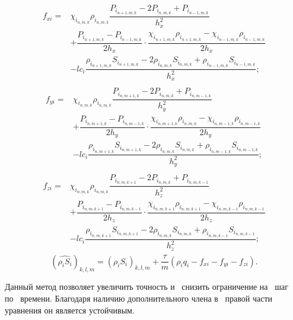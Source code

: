 \begin{eqnarray*}
  \begin{aligned}
    f_{xi} =& \chi_{i_{n,m,k}} \rho_{i_{n,m,k}} \dfrac{P_{i_{n+1,m,k}} - 2P_{i_{n,m,k}} + P_{i_{n-1,m,k}}}{h_x^2} \\
    &+ \dfrac{P_{i_{n+1,m,k}}-P_{i_{n-1,m,k}}}{2h_x} \cdot \dfrac{\chi_{i_{n+1,m,k}} \rho_{i_{n+1,m,k}}-\chi_{i_{n-1,m,k}} \rho_{i_{n-1,m,k}}}{2h_x} \\
    &- lc_i\dfrac{\rho_{i_{n+1,m,k}}S_{i_{n+1,m,k}} - 2\rho_{i_{n,m,k}}S_{i_{n,m,k}} + \rho_{i_{n-1,m,k}}S_{i_{n-1,m,k}}}{h_x^2};
  \end{aligned}
\end{eqnarray*}
\begin{eqnarray*}
  \begin{aligned}
    f_{yi} =& \chi_{i_{n,m,k}} \rho_{i_{n,m,k}} \dfrac{P_{i_{n,m+1,k}} - 2P_{i_{n,m,k}} + P_{i_{n,m-1,k}}}{h_y^2} \\
    &+ \dfrac{P_{i_{n,m+1,k}}-P_{i_{n,m-1,k}}}{2h_y} \cdot \dfrac{\chi_{i_{n,m+1,k}} \rho_{i_{n,m,k}}-\chi_{i_{n,m-1,k}} \rho_{i_{n,m-1,k}}}{2h_y} \\
    &- lc_i\dfrac{\rho_{i_{n,m+1,k}}S_{i_{n,m+1,k}} - 2\rho_{i_{n,m,k}}S_{i_{n,m,k}} + \rho_{i_{n,m-1,k}}S_{i_{n,m-1,k}}}{h_y^2};
  \end{aligned}
    \end{eqnarray*}
\begin{eqnarray*}
  \begin{aligned}
    f_{zi} =& \chi_{i_{n,m,k}} \rho_{i_{n,m,k}} \dfrac{P_{i_{n,m,k+1}} - 2P_{i_{n,m,k}} + P_{i_{n,m,k-1}}}{h_z^2} \\
    &+ \dfrac{P_{i_{n,m,k+1}}-P_{i_{n,m,k-1}}}{2h_z} \cdot \dfrac{\chi_{i_{n,m,k+1}} \rho_{i_{n,m,k+1}}-\chi_{i_{n,m,k-1}} \rho_{i_{n,m,k-1}}}{2h_z} \\
    &- lc_i\dfrac{\rho_{i_{n,m,k+1}}S_{i_{n,m,k+1}} - 2\rho_{i_{n,m,k}}S_{i_{n,m,k}} + \rho_{i_{n,m,k-1}}S_{i_{n,m,k-1}}}{h_z^2};
  \end{aligned}
\end{eqnarray*}
\begin{equation*}
    (\widehat{\rho_i S_i})_{k,l,m}=(\rho_i S_i)_{k,l,m}+\frac{\tau}{m}(\rho_i q_i - f_{xi} - f_{yi} - f_{zi}).
\end{equation*}

Данный метод позволяет увеличить точность и~ снизить ограничение
на~ шаг по~ времени. Благодаря наличию дополнительного члена в~ правой
части уравнения он является устойчивым.

